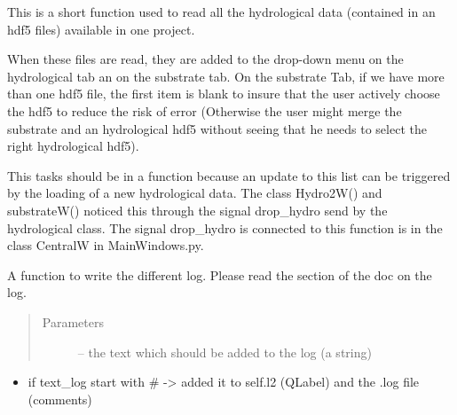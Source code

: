 \documentclass[letterpaper,10pt,english]{sphinxmanual}
\begin{document}
\begin{fulllineitems}
\begin{fulllineitems}
\end{fulllineitems}


\begin{fulllineitems}
\label{\detokenize{index:src_GUI.Main_windows_1.CentralW.update_hydro_hdf5_name}}
This is a short function used to read all the hydrological data (contained in an hdf5 files) available in
one project.

When these files are read, they are added to the drop-down menu on the hydrological tab an on the substrate tab.
On the substrate Tab, if we have more than one hdf5 file, the first item is blank to insure that the user
actively choose the hdf5 to reduce the risk of error (Otherwise the user might merge the substrate and
an hydrological hdf5 without seeing that he needs to select the right hydrological hdf5).

This tasks should be in a function because an update to this list can be triggered by the loading of a new
hydrological data. The class Hydro2W() and substrateW() noticed this through the signal drop\_hydro
send by the hydrological class. The signal drop\_hydro is connected to this function is in the class
CentralW in MainWindows.py.

\end{fulllineitems}


\begin{fulllineitems}
\label{\detokenize{index:src_GUI.Main_windows_1.CentralW.write_log}}
A function to write the different log. Please read the section of the doc on the log.
\begin{quote}\begin{description}
\item[{Parameters}] \leavevmode
{} -- the text which should be added to the log (a string)

\end{description}\end{quote}
\begin{itemize}
\item {} 
if text\_log start with \# -\textgreater{} added it to self.l2 (QLabel) and the .log file (comments)


\end{itemize}
\end{fulllineitems}
\end{fulllineitems}
\end{document}
